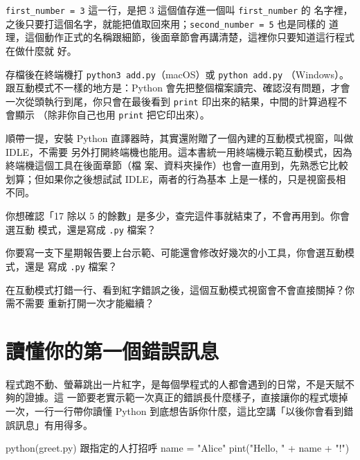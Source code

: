 
\texttt{first\_number = 3} 這一行，是把 3 這個值存進一個叫 \texttt{first\_number} 的
名字裡，之後只要打這個名字，就能把值取回來用；\texttt{second\_number = 5} 也是同樣的
道理，這個動作正式的名稱跟細節，後面章節會再講清楚，這裡你只要知道這行程式在做什麼就
好。

存檔後在終端機打 \texttt{python3 add.py}（macOS）或 \texttt{python add.py}
（Windows）。跟互動模式不一樣的地方是：Python 會先把整個檔案讀完、確認沒有問題，才會
一次從頭執行到尾，你只會在最後看到 \texttt{print} 印出來的結果，中間的計算過程不會顯示
（除非你自己也用 \texttt{print} 把它印出來）。

順帶一提，安裝 Python 直譯器時，其實還附贈了一個內建的互動模式視窗，叫做 IDLE，不需要
另外打開終端機也能用。這本書統一用終端機示範互動模式，因為終端機這個工具在後面章節（檔
案、資料夾操作）也會一直用到，先熟悉它比較划算；但如果你之後想試試 IDLE，兩者的行為基本
上是一樣的，只是視窗長相不同。


\begin{drills}[label=drills:interpreter-vs-file]
\item 你想確認「17 除以 5 的餘數」是多少，查完這件事就結束了，不會再用到。你會選互動
模式，還是寫成 \texttt{.py} 檔案？
\item 你要寫一支下星期報告要上台示範、可能還會修改好幾次的小工具，你會選互動模式，還是
寫成 \texttt{.py} 檔案？
\item 在互動模式打錯一行、看到紅字錯誤之後，這個互動模式視窗會不會直接關掉？你需不需要
重新打開一次才能繼續？
\end{drills}

\section{讀懂你的第一個錯誤訊息}
\label{sec:reading-errors}

程式跑不動、螢幕跳出一片紅字，是每個學程式的人都會遇到的日常，不是天賦不夠的證據。這
一節要老實示範一次真正的錯誤長什麼樣子，直接讓你的程式壞掉一次，一行一行帶你讀懂
Python 到底想告訴你什麼，這比空講「以後你會看到錯誤訊息」有用得多。

\begin{example}{python}{(greet.py) 跟指定的人打招呼}
name = "Alice"
pint("Hello, " + name + "!")
\end{example}

